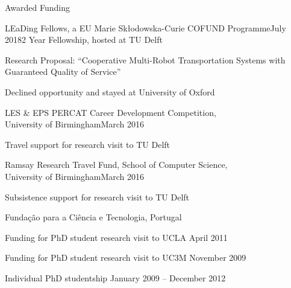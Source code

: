 
\begin{rSection}{Awarded Funding}

\begin{rSubsection}{ LEaDing Fellows, a  EU Marie Skłodowska-Curie COFUND Programme}{July 2018}{2 Year Fellowship, hosted at TU Delft }{}
\item Research Proposal: ``Cooperative Multi-Robot Transportation Systems with Guaranteed Quality of Service''
\item Declined opportunity and stayed at University of Oxford
\end{rSubsection}

\begin{rSubsection}{ LES \& EPS PERCAT Career Development Competition,\\ University of Birmingham}{March 2016}{}{}
\item Travel support for research visit to TU Delft\\
\end{rSubsection}

\begin{rSubsection}{ Ramsay Research Travel Fund, School of Computer Science, \\ University of Birmingham}{March 2016}{}{}
\item Subsistence support for research visit to TU Delft \\
\end{rSubsection} 

\begin{rSubsection}{ Funda\c{c}\~{a}o para a Ci\^{e}ncia e Tecnologia, Portugal}{}{}{}
\item Funding for PhD student research visit to UCLA \hfill April 2011\\

\item Funding for PhD student research visit to UC3M \hfill November 2009\\

\item Individual PhD studentship  \hfill  January 2009 -- December 2012\\

\end{rSubsection}

\end{rSection}
